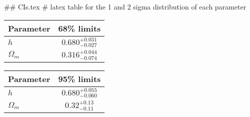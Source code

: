 ## CIs.tex
# latex table for the 1 and 2 sigma distribution of each parameter

\begin{tabular} { l  c}
 Parameter &  68\% limits\\
\hline
{\boldmath$h              $} & $0.680^{+0.031}_{-0.027}   $\\
{\boldmath$\Omega_m       $} & $0.316^{+0.044}_{-0.074}   $\\
\hline
\end{tabular}

\begin{tabular} { l  c}
 Parameter &  95\% limits\\
\hline
{\boldmath$h              $} & $0.680^{+0.055}_{-0.060}   $\\
{\boldmath$\Omega_m       $} & $0.32^{+0.13}_{-0.11}      $\\
\hline
\end{tabular}
